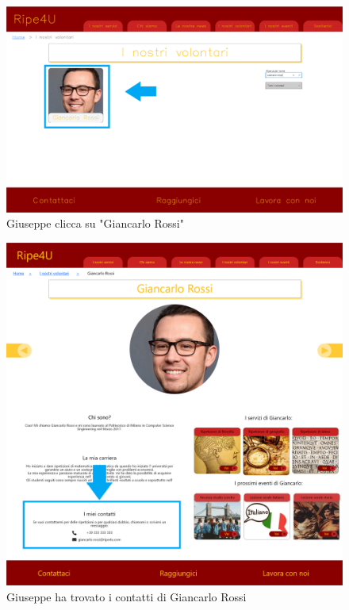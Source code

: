     \begin{figure}[H]
        \centering
        \includegraphics[scale=0.3]{resources/images/scenario3-3.png}
        \caption{Giuseppe clicca su "Giancarlo Rossi"}
    \end{figure}
    \begin{figure}[H]
        \centering
        \includegraphics[scale=0.3]{resources/images/scenario3-4.png}
        \caption{Giuseppe ha trovato i contatti di Giancarlo Rossi}
    \end{figure}
 